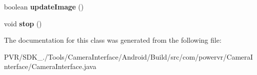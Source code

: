 \begin{DoxyCompactItemize}
\item 
\hypertarget{classcom_1_1powervr_1_1_camera_interface_1_1_camera_interface_aaf1582b68e090dd7d1496f6728ebda19}{boolean {\bfseries update\+Image} ()}\label{classcom_1_1powervr_1_1_camera_interface_1_1_camera_interface_aaf1582b68e090dd7d1496f6728ebda19}

\item 
\hypertarget{classcom_1_1powervr_1_1_camera_interface_1_1_camera_interface_aa8e8d9275987ea79b9a52ea4b273ea05}{void {\bfseries stop} ()}\label{classcom_1_1powervr_1_1_camera_interface_1_1_camera_interface_aa8e8d9275987ea79b9a52ea4b273ea05}

\end{DoxyCompactItemize}


The documentation for this class was generated from the following file\+:\begin{DoxyCompactItemize}
\item 
P\+V\+R/\+S\+D\+K\+\_./\+Tools/\+Camera\+Interface/\+Android/\+Build/src/com/powervr/\+Camera\+Interface/Camera\+Interface.\+java\end{DoxyCompactItemize}
